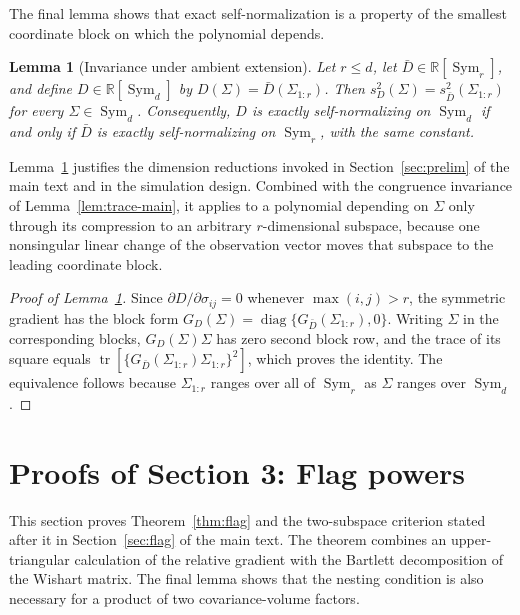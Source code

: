 \documentclass[12pt,a4paper]{article}
\theoremstyle{plain}
\newtheorem{lemma}{Lemma}
\theoremstyle{definition}
\newcommand{\R}{\mathbb{R}}
\newcommand{\Sym}{\operatorname{Sym}}
\newcommand{\tr}{\operatorname{tr}}
\newcommand{\diag}{\operatorname{diag}}
\begin{document}
The final lemma shows that exact self-normalization is a property of the smallest coordinate block on which the polynomial depends.

\begin{lemma}[Invariance under ambient extension]
\label{lem:ambient}
    Let $r\le d$, let $\bar{D}\in\R[\Sym_r]$, and define $D\in\R[\Sym_d]$ by $D(\Sigma)=\bar{D}(\Sigma_{1:r})$.
    Then $s_D^2(\Sigma)=s_{\bar D}^2(\Sigma_{1:r})$ for every $\Sigma\in\Sym_d$.
    Consequently, $D$ is exactly self-normalizing on $\Sym_d$ if and only if $\bar{D}$ is exactly self-normalizing on $\Sym_r$, with the same constant.
\end{lemma}

Lemma~\ref{lem:ambient} justifies the dimension reductions invoked in Section~\ref{sec:prelim} of the main text and in the simulation design.
Combined with the congruence invariance of Lemma~\ref{lem:trace-main}, it applies to a polynomial depending on $\Sigma$ only through its compression to an arbitrary $r$-dimensional subspace, because one nonsingular linear change of the observation vector moves that subspace to the leading coordinate block.

\begin{proof}[Proof of Lemma~\ref{lem:ambient}]
    Since $\partial D/\partial\sigma_{ij}=0$ whenever $\max(i,j)>r$, the symmetric gradient has the block form $G_D(\Sigma)=\diag\{G_{\bar{D}}(\Sigma_{1:r}),0\}$.
    Writing $\Sigma$ in the corresponding blocks, $G_D(\Sigma)\Sigma$ has zero second block row, and the trace of its square equals $\tr[\{G_{\bar{D}}(\Sigma_{1:r})\Sigma_{1:r}\}^2]$, which proves the identity.
    The equivalence follows because $\Sigma_{1:r}$ ranges over all of $\Sym_r$ as $\Sigma$ ranges over $\Sym_d$.
\end{proof}

\section{Proofs of Section 3: Flag powers}
\label{supp:flag-proofs}

This section proves Theorem~\ref{thm:flag} and the two-subspace criterion stated after it in Section~\ref{sec:flag} of the main text.
The theorem combines an upper-triangular calculation of the relative gradient with the Bartlett decomposition of the Wishart matrix.
The final lemma shows that the nesting condition is also necessary for a product of two covariance-volume factors.
\end{document}

